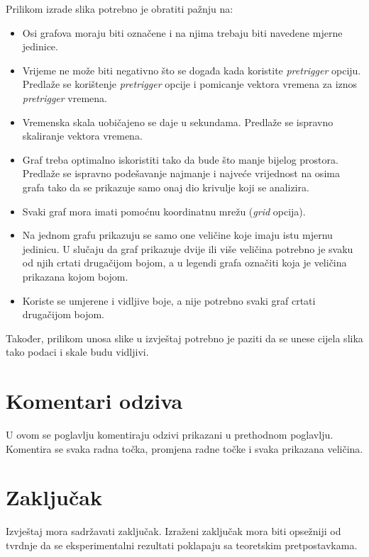 \documentclass{izvjestaj}
\begin{document}
Prilikom izrade slika potrebno je obratiti pažnju na:

\begin{itemize}
\item Osi grafova moraju biti označene i na njima trebaju biti navedene mjerne jedinice.
\item Vrijeme ne može biti negativno što se događa kada koristite \emph{pretrigger} opciju. Predlaže se korištenje \emph{pretrigger} opcije i pomicanje vektora vremena za iznos \emph{pretrigger} vremena.
\item Vremenska skala uobičajeno se daje u sekundama. Predlaže se ispravno skaliranje vektora vremena.
\item Graf treba optimalno iskoristiti tako da bude što manje bijelog prostora. Predlaže se ispravno podešavanje najmanje i najveće vrijednost na osima grafa tako da se prikazuje samo onaj dio krivulje koji se analizira.
\item Svaki graf mora imati pomoćnu koordinatnu mrežu (\emph{grid} opcija).
\item Na jednom grafu prikazuju se samo one veličine koje imaju istu mjernu jedinicu. U slučaju da graf prikazuje dvije ili više veličina potrebno je svaku od njih crtati drugačijom bojom, a u legendi grafa označiti koja je veličina prikazana kojom bojom.
\item Koriste se umjerene i vidljive boje, a nije potrebno svaki graf crtati drugačijom bojom.
\end{itemize}

Također, prilikom unosa slike u izvještaj potrebno je paziti da se unese cijela slika tako podaci i skale budu vidljivi.


\section{Komentari odziva}

U ovom se poglavlju komentiraju odzivi prikazani u prethodnom poglavlju. Komentira se svaka radna točka, promjena radne točke i svaka prikazana veličina. 

\section{Zaključak}

Izvještaj mora sadržavati zaključak. Izraženi zaključak mora biti opsežniji od tvrdnje da se eksperimentalni rezultati poklapaju sa teoretskim pretpostavkama.
\end{document}

